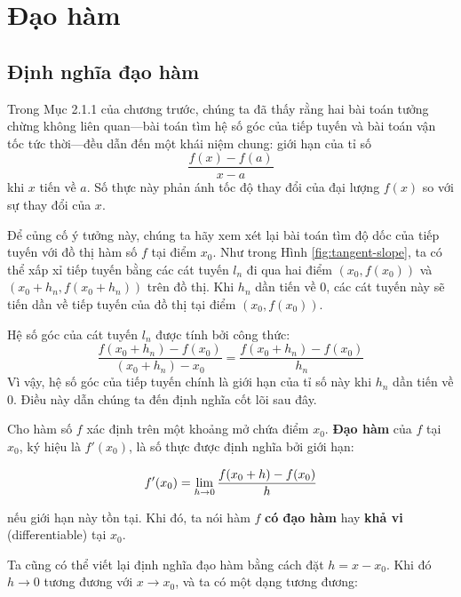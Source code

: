 \section{Đạo hàm}
\label{sec:derivative}

\subsection{Định nghĩa đạo hàm}

Trong Mục 2.1.1 của chương trước, chúng ta đã thấy rằng hai bài toán tưởng chừng không liên quan---bài toán tìm hệ số góc của tiếp tuyến và bài toán vận tốc tức thời---đều dẫn đến một khái niệm chung: giới hạn của tỉ số
$$
\dfrac{f(x) - f(a)}{x-a}
$$
khi $x$ tiến về $a$. Số thực này phản ánh tốc độ thay đổi của đại lượng $f(x)$ so với sự thay đổi của $x$.

Để củng cố ý tưởng này, chúng ta hãy xem xét lại bài toán tìm độ dốc của tiếp tuyến với đồ thị hàm số $f$ tại điểm $x_0$. Như trong Hình \ref{fig:tangent-slope}, ta có thể xấp xỉ tiếp tuyến bằng các cát tuyến $l_n$ đi qua hai điểm $(x_0, f(x_0))$ và $(x_0 + h_n, f(x_0 + h_n))$ trên đồ thị. Khi $h_n$ dần tiến về 0, các cát tuyến này sẽ tiến dần về tiếp tuyến của đồ thị tại điểm $(x_0, f(x_0))$.

Hệ số góc của cát tuyến $l_n$ được tính bởi công thức:
$$
\dfrac{f(x_0 + h_n) - f(x_0)}{(x_0 + h_n) - x_0} = \dfrac{f(x_0 + h_n) - f(x_0)}{h_n}
$$
Vì vậy, hệ số góc của tiếp tuyến chính là giới hạn của tỉ số này khi $h_n$ dần tiến về 0. Điều này dẫn chúng ta đến định nghĩa cốt lõi sau đây.



\begin{definition}
Cho hàm số $f$ xác định trên một khoảng mở chứa điểm $x_0$. \textbf{Đạo hàm} của $f$ tại $x_0$, ký hiệu là $f'(x_0)$, là số thực được định nghĩa bởi giới hạn:

\begin{importantbox}
    \[f'(x_0) = \lim\limits_{h \to 0} \dfrac{f(x_0 + h) - f(x_0)}{h}\]
\end{importantbox}

nếu giới hạn này tồn tại. Khi đó, ta nói hàm $f$ \textbf{có đạo hàm} hay \textbf{khả vi} (differentiable) tại $x_0$.
\end{definition}

Ta cũng có thể viết lại định nghĩa đạo hàm bằng cách đặt $h = x - x_0$. Khi đó $h \to 0$ tương đương với $x \to x_0$, và ta có một dạng tương đương:

